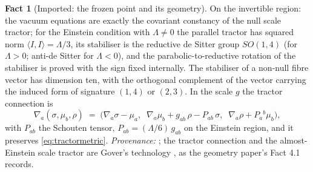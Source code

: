 \documentclass[11pt]{article}
\theoremstyle{definition}
\newtheorem{fact}[theorem]{Fact}
\newcommand{\ip}[2]{\langle #1, #2\rangle}
\begin{document}
\begin{fact}[Imported: the frozen point and its geometry]\label{fact:frozen}
On the invertible region: the vacuum equations are exactly the covariant constancy of the null scale tractor; for the Einstein condition with $\Lambda \neq 0$ the parallel tractor has squared norm $\ip{I}{I} = \Lambda/3$, its stabiliser is the reductive de Sitter group $SO(1,4)$ (for $\Lambda > 0$; anti-de Sitter for $\Lambda < 0$), and the parabolic-to-reductive rotation of the stabiliser is proved with the sign fixed internally. The stabiliser of a non-null fibre vector has dimension ten, with the orthogonal complement of the vector carrying the induced form of signature $(1,4)$ or $(2,3)$. In the scale $g$ the tractor connection is
\begin{equation}\label{eq:conn}
\nabla_a(\sigma, \mu_b, \rho) \;=\; \bigl(\nabla_a\sigma - \mu_a,\;\; \nabla_a\mu_b + g_{ab}\,\rho - P_{ab}\,\sigma,\;\; \nabla_a\rho + P_a{}^{b}\mu_b\bigr),
\end{equation}
with $P_{ab}$ the Schouten tensor, $P_{ab} = (\Lambda/6)\,g_{ab}$ on the Einstein region, and it preserves \eqref{eq:tractormetric}. \emph{Provenance:} \cite[Fact~4.1, Thms.~4.5, 4.7, Props.~4.4, 4.10, Lem.~4.8]{ButlerT6}; the tractor connection and the almost-Einstein scale tractor are Gover's technology \cite{Gover2010}, as the geometry paper's Fact 4.1 records.
\end{fact}
\end{document}
